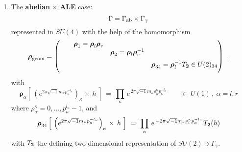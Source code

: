 \documentclass[12pt]{amsart}
\newcommand {\3}{\underline{\bf 3}}
\newcommand {\4}{\underline{\bf 4}}
\newcommand {\6}{\underline{\bf 6}}
\newcommand{\beq}{\begin{equation}}
\newcommand{\eeq}{\end{equation}}
\newcommand {\bro} {{\boldsymbol{\rho}}}
\newcommand{\Gamab}{{\Gamma}_{\rm ab}}
\begin{document}
\begin{enumerate}
\item The  {\bf abelian} $\times$  {\bf ALE} case:
\beq
{\Gamma} = {\Gamab} \times {\Gamma}_{\gamma} \label{eq:nonab12}
\eeq
represented in $SU(4)$
with the help of the homomorphism 
\beq
{\bro}_{\rm geom} = \left(  \begin{matrix} & \begin{matrix} & {\bro}_{1}= {\bro}_{l}{\bro}_{r} & \\
& &  {\bro}_{2} = {\bro}_{l}{\bro}_{r}^{-1} \end{matrix}  &   \begin{matrix} &  & \\
& &   \end{matrix} \\
&  \begin{matrix} &  & \\
& &   \end{matrix} &  {\bro}_{34} = {\bro}_{l}^{-1} T_{\bf 2} \in U(2)_{34} \end{matrix}  \right) \  , 
\eeq
with
\beq
{\bro}_{\alpha} \left[ \ \left( e^{2\pi \sqrt{-1}m_{\kappa}p_{\kappa}^{-l_{\kappa}}}  \right)_{\kappa} \, \times \, h \ \right] \ = \ \prod_{\kappa} \, e^{\, 2\pi\sqrt{-1}m_{\kappa}  {\rho}^{\kappa}_{\alpha}p_{\kappa}^{-l_{\kappa}}} \qquad \in\ U(1) \, , \ {\alpha} = l, r  
\eeq
where ${\rho}^{\kappa}_{\alpha} = 0, \ldots , p_{\kappa}^{l_{\kappa}}-1$, and
\beq
{\bro}_{34} \left[ \ \left( e^{2\pi \sqrt{-1}m_{\kappa}p_{\kappa}^{-l_{\kappa}}} \right)_{\kappa} \, \times \, h \ \right] \ = \ \prod_{\kappa} \, e^{\, - 2\pi\sqrt{-1}m_{\kappa}  {\rho}^{\kappa}_{l}p_{\kappa}^{-l_{\kappa}}} T_{\bf 2}(h) 
\label{eq:34hom}
\eeq
with $T_{\bf 2}$ the defining two-dimensional representation of $SU(2) \ni {\Gamma}_{\gamma}$. 


\end{enumerate}
\end{document}
